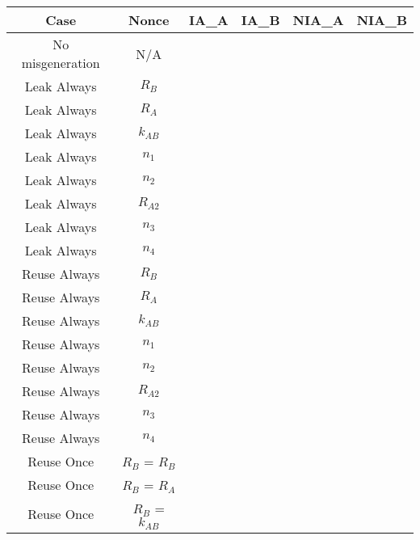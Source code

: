 \documentclass[crop]{standalone}
\newcommand{\noattack}{\color{ForestGreen}\usym{2713}\color{black}}
\newcommand{\attack}{\color{red}\usym{2717}\color{black}}
\begin{document}
\parbox{15cm}{
\begin{tabular}{|c|c|c|c|c|c|}
\hline
Case & Nonce & IA\_A & IA\_B & NIA\_A & NIA\_B \\ \hline
No misgeneration & N/A & \noattack & \noattack & \noattack & \noattack\\ \hline
Leak Always & $R_B$ & \noattack & \noattack & \noattack & \noattack\\ \hline
Leak Always & $R_A$ & \noattack & \noattack & \noattack & \noattack\\ \hline
Leak Always & $k_{AB}$ & \attack & \attack & \attack & \attack\\ \hline
Leak Always & $n_1$ & \noattack & \noattack & \noattack & \noattack\\ \hline
Leak Always & $n_2$ & \noattack & \noattack & \noattack & \noattack\\ \hline
Leak Always & $R_{A2}$ & \noattack & \noattack & \noattack & \noattack\\ \hline
Leak Always & $n_3$ & \noattack & \noattack & \noattack & \noattack\\ \hline
Leak Always & $n_4$ & \noattack & \noattack & \noattack & \noattack\\ \hline
Reuse Always & $R_B$ & \noattack & \attack & \noattack & \noattack\\ \hline
Reuse Always & $R_A$ & \noattack & \noattack & \noattack & \noattack\\ \hline
Reuse Always & $k_{AB}$ & \attack & \attack & \attack & \attack\\ \hline
Reuse Always & $n_1$ & \attack & \attack & \attack & \attack\\ \hline
Reuse Always & $n_2$ & \attack & \attack & \attack & \attack\\ \hline
Reuse Always & $R_{A2}$ & \noattack & \noattack & \noattack & \noattack\\ \hline
Reuse Always & $n_3$ & \noattack & \noattack & \noattack & \noattack\\ \hline
Reuse Always & $n_4$ & \noattack & \noattack & \noattack & \noattack\\ \hline
Reuse Once & $R_B$ = $R_B$ & \noattack & \attack & \noattack & \noattack\\ \hline
Reuse Once & $R_B$ = $R_A$ & \noattack & \noattack & \noattack & \noattack\\ \hline
Reuse Once & $R_B$ = $k_{AB}$ & \attack & \attack & \attack & \attack\\ \hline

\end{tabular}}
\end{document}
